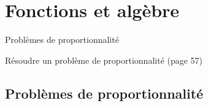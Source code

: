 \documentclass[a4paper,11pt]{report}
\begin{document}
\newcommand{\chapterName}{Fonctions et algèbre}
\newcommand{\serieName}{Problèmes de proportionnalité}


\chapter*{\chapterName}
\thispagestyle{empty}

\begin{amL}{\serieName}{
\item Résoudre un problème de proportionnalité (page 57)}
\end{amL}
\section*{\serieName}
\setcounter{page}{1}
\thispagestyle{firstPage}







\end{document}
